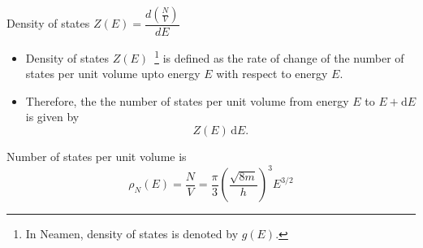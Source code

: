 \begin{frame}[label=pre-M2T1-slot1]{Density of states $Z(E)=\dfrac{d(\tfrac{N}{V})}{dE}$}
	\begin{definition}
\begin{itemize}
	\item Density of states \(Z(E)\)~\footnote{In Neamen, density of states is denoted by \(g(E)\).} is defined as the rate of change of the number of states per unit volume upto energy \(E\) with respect to energy \(E\).
	\item Therefore, the the number of states per unit volume from energy \(E\) to \(E+ \mathrm{d}E\) is given by
	\[
	Z(E)\, \mathrm{d}E.
	\]
\end{itemize}
	\end{definition}
	Number of states per unit volume is
	\[
	\rho_N(E) = \frac{N}{V} = \frac{\pi}{3}\left(\frac{\sqrt{8m}}{h}\right)^3 E^{3/2}
	\]
\end{frame}
	

